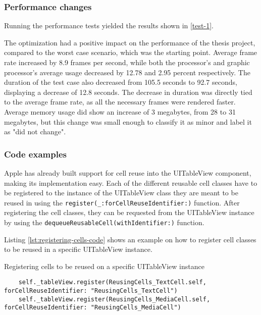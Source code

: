 \documentclass[a4paper,12pt]{article}
\begin{document}
\subsubsection{Performance changes}
Running the performance tests yielded the results shown in \autoref{test-1}.

The optimization had a positive impact on the performance of the thesis project, compared to the worst case scenario, which was the starting point. Average frame rate increased by 8.9 frames per second, while both the processor's and graphic processor's average usage decreased by 12.78 and 2.95 percent respectively. The duration of the test case also decreased from 105.5 seconds to 92.7 seconds, displaying a decrease of 12.8 seconds. The decrease in duration was directly tied to the average frame rate, as all the necessary frames were rendered faster. Average memory usage did show an increase of 3 megabytes, from 28 to 31 megabytes, but this change was small enough to classify it as minor and label it as "did not change".

\subsubsection{Code examples}
Apple has already built support for cell reuse into the UITableView component, making its implementation easy. Each of the different reusable cell classes have to be registered to the instance of the UITableView class they are meant to be reused in using the \texttt{register(_:forCellReuseIdentifier:)} function.\cite{AppleRegisterMethod} After registering the cell classes, they can be requested from the UITableView instance by using the \texttt{dequeueReusableCell(withIdentifier:)} function.\cite{AppleDequeueReusableCellMethod}

Listing \autoref{lst:registering-cells-code} shows an example on how to register cell classes to be reused in a specific UITableView instance.
\begin{listing}[H]
  \caption{Registering cells to be reused on a specific UITableView instance}
  \label{lst:registering-cells-code}
  \begin{verbatim}
    self._tableView.register(ReusingCells_TextCell.self, forCellReuseIdentifier: "ReusingCells_TextCell")
    self._tableView.register(ReusingCells_MediaCell.self, forCellReuseIdentifier: "ReusingCells_MediaCell")
  \end{verbatim}
\end{listing}
\end{document}
